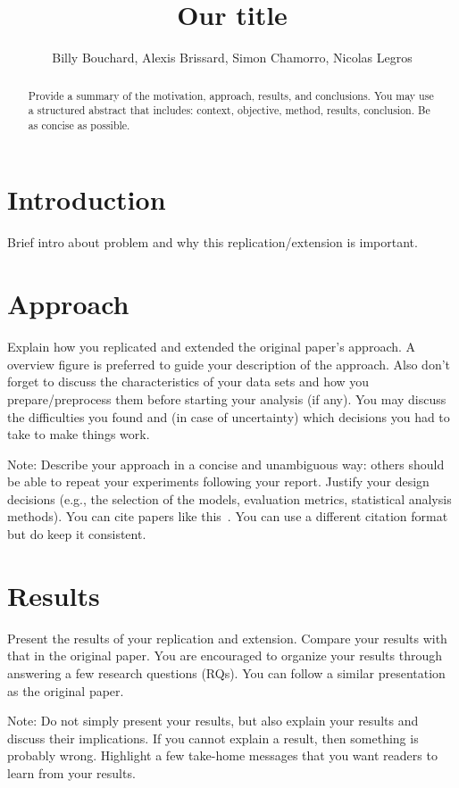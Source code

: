 \documentclass[10pt, conference]{IEEEtran}
\title{Our title}
\author{Billy Bouchard, Alexis Brissard, Simon Chamorro, Nicolas Legros}
\begin{document}
\maketitle

\begin{abstract}
Provide a summary of the motivation, approach, results, and conclusions. You may use a structured abstract that includes: context, objective, method, results, conclusion.
Be as concise as possible.
\end{abstract}


\section{Introduction}
\label{sec:introduction}

Brief intro about problem and why this replication/extension is important.


\section{Approach}
\label{sec:approach}

Explain how you replicated and extended the original paper's approach. A overview figure is preferred to guide your description of the approach. Also don't forget to discuss the characteristics of your data sets and how you prepare/preprocess them before starting your analysis (if any).
You may discuss the difficulties you found and (in case of uncertainty) which decisions you had to take to make things work.

Note: Describe your approach in a concise and unambiguous way: others should be able to repeat your experiments following your report.
Justify your design decisions (e.g., the selection of the models, evaluation metrics, statistical analysis methods). 
You can cite papers like this~\cite{he2016experience}. You can use a different citation format but do keep it consistent.


\section{Results}
\label{sec:results}

Present the results of your replication and extension. Compare your results with that in the original paper. You are encouraged to organize your results through answering a few research questions (RQs). You can follow a similar presentation as the original paper. 

Note: Do not simply present your results, but also explain your results and discuss their implications. If you cannot explain a result, then something is probably wrong. Highlight a few take-home messages that you want readers to learn from your results.
\end{document}
